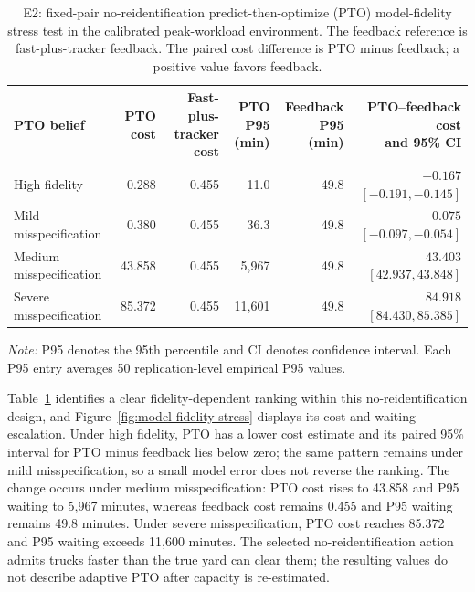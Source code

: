 \documentclass[preprint,12pt,authoryear,a4paper]{elsarticle}
\begin{document}
\begin{table}[htbp]
\centering
\caption{E2: fixed-pair no-reidentification predict-then-optimize (PTO) model-fidelity stress test in the calibrated peak-workload environment. The feedback reference is fast-plus-tracker feedback. The paired cost difference is PTO minus feedback; a positive value favors feedback.}
\label{tab:e2-fidelity-results}
\scriptsize
\setlength{\tabcolsep}{1.5pt}
\begin{tabular*}{\textwidth}{@{\extracolsep{\fill}}lrrrrr@{}}
\toprule
PTO belief & PTO cost & \makecell[r]{Fast-plus-tracker\\cost} & \makecell[r]{PTO P95\\(min)} & \makecell[r]{Feedback P95\\(min)} & \makecell[r]{PTO--feedback cost\\and 95\% CI} \\
\midrule
High fidelity & 0.288 & 0.455 & 11.0 & 49.8 & \makecell[r]{$-0.167$\\$[-0.191,-0.145]$} \\
Mild misspecification & 0.380 & 0.455 & 36.3 & 49.8 & \makecell[r]{$-0.075$\\$[-0.097,-0.054]$} \\
Medium misspecification & 43.858 & 0.455 & 5,967 & 49.8 & \makecell[r]{$43.403$\\$[42.937,43.848]$} \\
Severe misspecification & 85.372 & 0.455 & 11,601 & 49.8 & \makecell[r]{$84.918$\\$[84.430,85.385]$} \\
\bottomrule
\end{tabular*}
\begin{minipage}{\textwidth}
\footnotesize\raggedright
\textit{Note:} P95 denotes the 95th percentile and CI denotes confidence interval. Each P95 entry averages 50 replication-level empirical P95 values.
\end{minipage}
\end{table}

Table~\ref{tab:e2-fidelity-results} identifies a clear fidelity-dependent ranking within this no-reidentification design, and Figure~\ref{fig:model-fidelity-stress} displays its cost and waiting escalation. Under high fidelity, PTO has a lower cost estimate and its paired 95\% interval for PTO minus feedback lies below zero; the same pattern remains under mild misspecification, so a small model error does not reverse the ranking. The change occurs under medium misspecification: PTO cost rises to 43.858 and P95 waiting to 5,967 minutes, whereas feedback cost remains 0.455 and P95 waiting remains 49.8 minutes. Under severe misspecification, PTO cost reaches 85.372 and P95 waiting exceeds 11,600 minutes. The selected no-reidentification action admits trucks faster than the true yard can clear them; the resulting values do not describe adaptive PTO after capacity is re-estimated.
\end{document}
